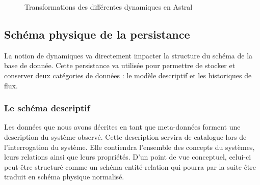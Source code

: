 \begin{figure}[ht]
    \centering
{}
\caption{Transformations des différentes dynamiques en Astral}\label{fig:contrib:asteroid:theorie:dynamics}
\end{figure}

\subsection{Schéma physique de la persistance}\label{sec:contrib:asteroid:theorie:schema}
La notion de dynamiques va directement impacter la structure du schéma de la base de donnée. Cette persistance va utilisée pour permettre de stocker et conserver deux catégories de données : le modèle descriptif et les historiques de flux.
\subsubsection{Le schéma descriptif}
Les données que nous avons décrites en tant que meta-données forment une description du système observé. Cette description servira de catalogue lors de l'interrogation du système. Elle contiendra l'ensemble des concepts du systèmes, leurs relations ainsi que leurs propriétés. D'un point de vue conceptuel, celui-ci peut-être structuré comme un schéma entité-relation qui pourra par la suite être traduit en schéma physique normalisé.

